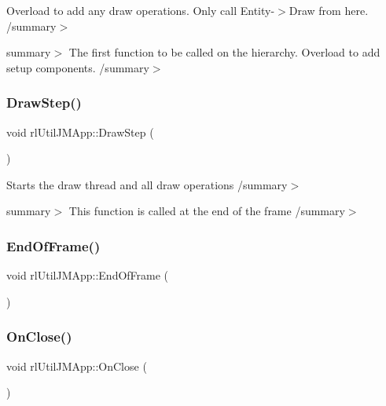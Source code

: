 Overload to add any draw operations. Only call Entity-\/$>$Draw from here. /summary$>$ 

summary$>$ The first function to be called on the hierarchy. Overload to add setup components. /summary$>$ \mbox{\label{classrl_util_j_m_app_ab85c6b31f7ff7d7825f13b0ebe49261d}} 
\subsubsection{\texorpdfstring{Draw\+Step()}{DrawStep()}}
{\footnotesize\ttfamily void rl\+Util\+J\+M\+App\+::\+Draw\+Step (\begin{DoxyParamCaption}{ }\end{DoxyParamCaption})\hspace{0.3cm}{\ttfamily [private]}}



Starts the draw thread and all draw operations /summary$>$ 

summary$>$ This function is called at the end of the frame /summary$>$ \mbox{\label{classrl_util_j_m_app_ad2333da858d397b08fd99fea22ad2c9d}} 
\subsubsection{\texorpdfstring{End\+Of\+Frame()}{EndOfFrame()}}
{\footnotesize\ttfamily void rl\+Util\+J\+M\+App\+::\+End\+Of\+Frame (\begin{DoxyParamCaption}{ }\end{DoxyParamCaption})\hspace{0.3cm}{\ttfamily [private]}}

\mbox{\label{classrl_util_j_m_app_a3f4f4b35aa1c6aa9ec469452c705d276}} 
\subsubsection{\texorpdfstring{On\+Close()}{OnClose()}}
{\footnotesize\ttfamily void rl\+Util\+J\+M\+App\+::\+On\+Close (\begin{DoxyParamCaption}{ }\end{DoxyParamCaption})\hspace{0.3cm}{\ttfamily [static]}}

